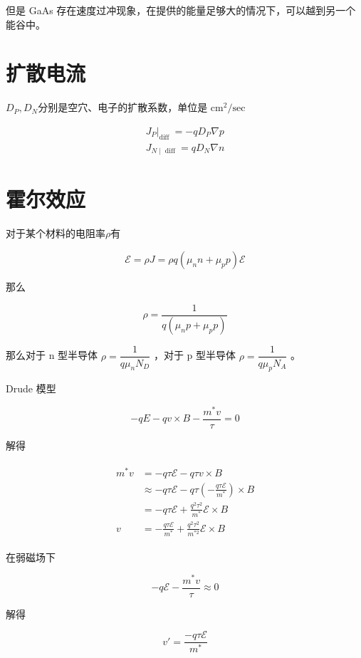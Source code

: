 \documentclass[cn,11pt,chinese,black,simple]{../elegantbook}
\begin{document}
但是 GaAs 存在速度过冲现象，在提供的能量足够大的情况下，可以越到另一个能谷中。

\section{扩散电流}

\(D_P, D_N\)分别是空穴、电子的扩散系数，单位是 \(\text{cm}^2/\text{sec}\)

\[\begin{array}{l}
    \left. J _{ P }\right|_{\text {diff }}=-q D_{ P } \nabla p \\
    J _{ N \mid \text { diff }}=q D_{ N } \nabla n
\end{array}\]

\section{霍尔效应}

对于某个材料的电阻率\(\rho\)有

\[\mathscr{E} = \rho J = \rho q (\mu_n n + \mu_p p) \mathscr{E}\]

那么 

\[\rho = \dfrac{1}{q (\mu_n p + \mu_p p)}\]

那么对于 n 型半导体 \(\rho = \dfrac{1}{q \mu_n N_D}\) ，对于 p 型半导体 \(\rho = \dfrac{1}{q \mu_p N_A}\) 。

Drude 模型

\[-q E -q v \times B -\frac{m^{*} v}{\tau}=0\]

解得

\[\begin{array}{l}
    \begin{aligned}
        m^{*} v &=-q \tau \mathscr{E} -q \tau v \times B \\
        &\approx-q \tau \mathscr{E} -q \tau\left(-\frac{q \tau \mathscr{E} }{m^{*}}\right) \times B \\
        &=-q \tau \mathscr{E} +\frac{q^{2} \tau^{2}}{m^{*}} \mathscr{E} \times B \\
        v&=-\frac{q \tau \mathscr{E} }{m^{*}}+\frac{q^{2} \tau^{2}}{m^{* 2}} \mathscr{E} \times B
    \end{aligned}
\end{array}\]

在弱磁场下

\[-q \mathscr{E} - \dfrac{m^* v}{\tau} \approx 0\]

解得 

\[v' = \dfrac{-q \tau \mathscr{E}}{m^*}\]
\end{document}
